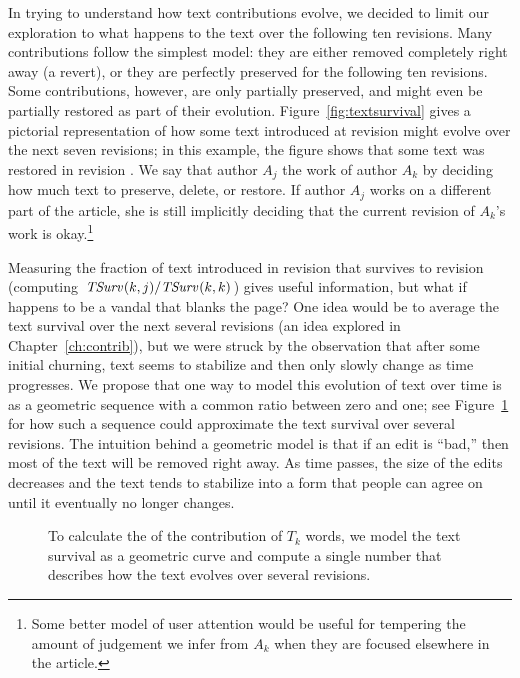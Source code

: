 In trying to understand how text contributions evolve, we decided
to limit our exploration to what happens to the text over the
following ten revisions.
Many contributions follow the simplest model: they are either
removed completely right away (a revert), or they are perfectly
preserved for the following ten revisions.
Some contributions, however, are only partially preserved, and
might even be partially restored as part of their evolution.
Figure~\ref{fig:textsurvival} gives a pictorial representation
of how some text introduced at revision  might
evolve over the next seven revisions; in this example, the
figure shows that some text was restored in revision .
We say that author $A_j$  the work of author
$A_k$ by deciding how much text to preserve, delete, or restore.
If author $A_j$ works on a different part of the article, she
is still implicitly deciding that the current revision of
$A_k$'s work is okay.\footnote{Some better model of
user attention would be useful for tempering the amount
of judgement we infer from
$A_k$ when they are focused elsewhere in the article.}

Measuring the fraction of text introduced in
revision  that survives to revision 
(\ie computing $\mathit{TSurv}_{}(k,j) / \mathit{TSurv}_{}(k,k)$)
gives useful information, but what if  happens to be
a vandal that blanks the page?
One idea would be to average the text survival over the next
several revisions (an idea explored in Chapter~\ref{ch:contrib}),
but we were struck by the observation that after some initial
churning, text seems to stabilize and then only slowly change
as time progresses.
We propose that one way to model this evolution of text over time
is as a geometric sequence with a common ratio between zero and one;
see Figure~\ref{fig:textlongevity} for how such a sequence could
approximate the text survival over several revisions.
The intuition behind a geometric model is that if an edit is
``bad,'' then most of the text will be removed right away.
As time passes, the size of the edits decreases and
the text tends to stabilize into a form
that people can agree on until it eventually no longer changes.


\begin{figure}[tbph]
\centering
{}
\caption{
    To calculate the  of the contribution
    of $T_k$ words, we model the text survival as a geometric curve
    and compute a single number that describes how the text evolves
    over several revisions.}
\label{fig:textlongevity}
\end{figure}

